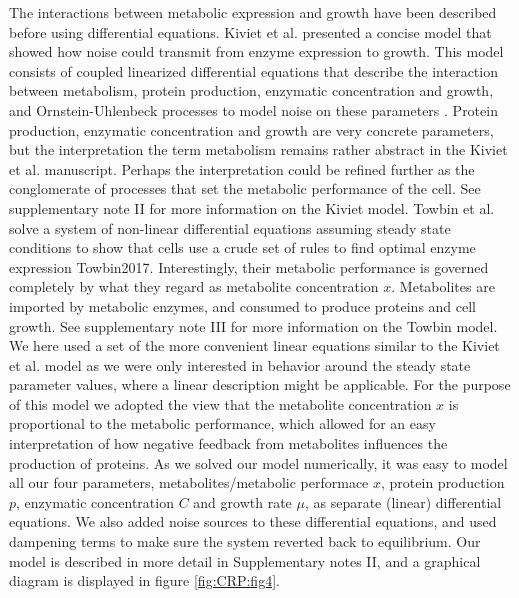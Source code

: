 








The interactions between metabolic expression and growth have been described before using differential equations.
%
Kiviet et al. presented a concise model that showed how noise could transmit from enzyme expression to growth.
This model consists of coupled linearized differential equations that describe the interaction between metabolism, protein production, enzymatic concentration and growth,
and Ornstein-Uhlenbeck processes to model noise on these parameters \cite{Kiviet2014}.
Protein production, enzymatic concentration and growth are very concrete parameters, 
but the interpretation the term metabolism remains rather abstract in the Kiviet et al. manuscript. 
Perhaps the interpretation could be refined further as the conglomerate of processes that set the metabolic performance of the cell.
See supplementary note II for more information on the Kiviet model.
%
Towbin et al. solve a system of non-linear differential equations assuming steady state conditions to show that cells use a crude set of rules to find optimal enzyme expression {Towbin2017}.
Interestingly, their metabolic performance is governed completely by what they regard as metabolite concentration $x$.
Metabolites are imported by metabolic enzymes, and consumed to produce proteins and cell growth.
See supplementary note III for more information on the Towbin model. 
%
We here used a set of the more convenient linear equations similar to the Kiviet et al. model as we were only interested in behavior around the steady state parameter values, where a linear description might be applicable.
For the purpose of this model we adopted the view that the metabolite concentration $x$ is proportional to the metabolic performance, 
which allowed for an easy interpretation of how negative feedback from metabolites influences the production of proteins.
%
As we solved our model numerically, it was easy to model all our four parameters, metabolites/metabolic performace $x$, protein production $p$, enzymatic concentration $C$ and growth rate $\mu$, as separate (linear) differential equations.
%
We also added noise sources to these differential equations, and used dampening terms to make sure the system reverted back to equilibrium.
%
Our model is described in more detail in Supplementary notes II, and a graphical diagram is displayed in figure \ref{fig:CRP:fig4}.









